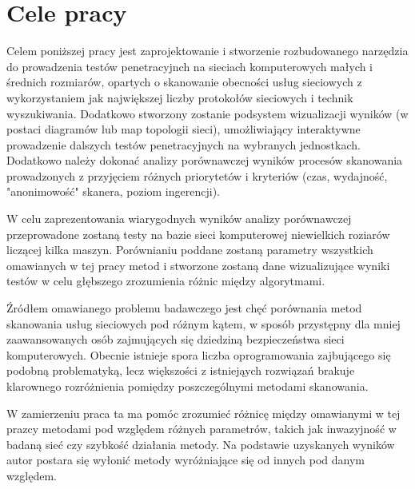 
\iffalse
☑ Co? Przedmiot, problem
☑ Jak? (Metoda , krótko)
☐ Dlaczego? Źródła problemu badawczego
☐ Po co? Implikacje, konsekwencje, walory
☐ Co będzie w kolejnych rozdziałach?
\fi

\section{Cele pracy}
\label{sec:celePracy}

Celem poniższej pracy jest zaprojektowanie i stworzenie rozbudowanego narzędzia do prowadzenia testów penetracyjnch na sieciach komputerowych małych i średnich rozmiarów, opartych o skanowanie obecności usług sieciowych z wykorzystaniem jak największej liczby protokołów sieciowych i technik wyszukiwania. Dodatkowo stworzony zostanie podsystem wizualizacji wyników (w postaci diagramów lub map topologii sieci), umożliwiający interaktywne prowadzenie dalszych testów penetracyjnych na wybranych jednostkach. Dodatkowo należy dokonać analizy porównawczej wyników procesów skanowania prowadzonych z przyjęciem różnych priorytetów i kryteriów (czas, wydajność, "anonimowość" skanera, poziom ingerencji).


W celu zaprezentowania wiarygodnych wyników analizy porównawczej przeprowadone zostaną testy na bazie sieci komputerowej niewielkich roziarów liczącej kilka maszyn. Porównianiu poddane zostaną parametry wszystkich omawianych w tej pracy metod i stworzone zostaną dane wizualizujące wyniki testów w celu głębszego zrozumienia różnic między algorytmami.


Źródłem omawianego problemu badawczego jest chęć porównania metod skanowania usług sieciowych pod różnym kątem, w sposób przystępny dla mniej zaawansowanych osób zajmujących się dziedziną bezpieczeństwa sieci komputerowych. Obecnie istnieje spora liczba oprogramowania zajbującego się podobną problematyką, lecz większości z istniejąych rozwiązań brakuje klarownego rozróżnienia pomiędzy poszczególnymi metodami skanowania. 


W zamierzeniu praca ta ma pomóc zrozumieć różnicę między omawianymi w tej prazcy metodami pod względem różnych parametrów, takich jak inwazyjność w badaną sieć czy szybkość działania metody. Na podstawie uzyskanych wyników autor postara się wyłonić metody wyróżniające się od innych pod danym względem.



